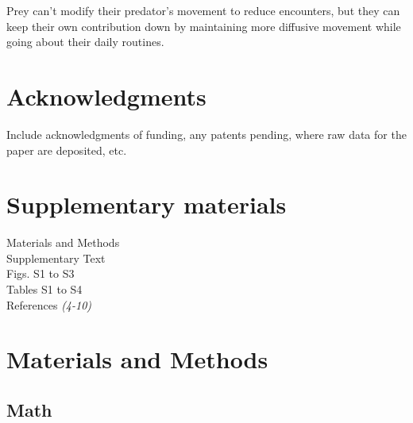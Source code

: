 \documentclass[12pt]{article}
\begin{document}
Prey can't modify their predator's movement to reduce encounters, but they can keep their own contribution down by maintaining more diffusive movement while going about their daily routines.











\section*{Acknowledgments}
Include acknowledgments of funding, any patents pending, where raw data for the paper are deposited, etc.

\section*{Supplementary materials}
Materials and Methods\\
Supplementary Text\\
Figs. S1 to S3\\
Tables S1 to S4\\
References \textit{(4-10)}


\section*{Materials and Methods}


\subsection*{Math}












\end{document}
